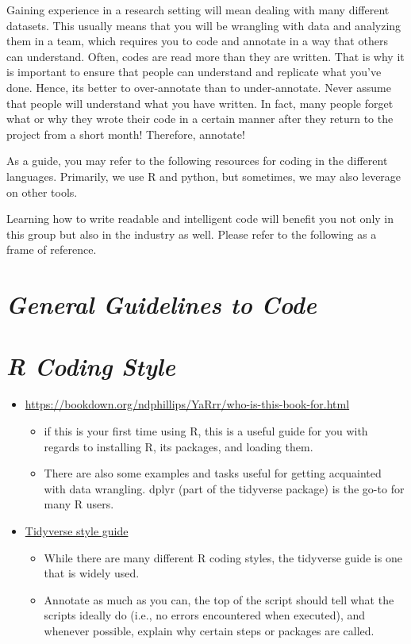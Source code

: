 \documentclass[
]{book}
\providecommand{\tightlist}{%
  \setlength{\itemsep}{0pt}\setlength{\parskip}{0pt}}
\begin{document}
Gaining experience in a research setting will mean dealing with many different datasets. This usually means that you will be wrangling with data and analyzing them in a team, which requires you to code and annotate in a way that others can understand. Often, codes are read more than they are written. That is why it is important to ensure that people can understand and replicate what you've done. Hence, its better to over-annotate than to under-annotate. Never assume that people will understand what you have written. In fact, many people forget what or why they wrote their code in a certain manner after they return to the project from a short month! Therefore, annotate!

As a guide, you may refer to the following resources for coding in the different languages. Primarily, we use R and python, but sometimes, we may also leverage on other tools.

Learning how to write readable and intelligent code will benefit you not only in this group but also in the industry as well. Please refer to the following as a frame of reference.

\hypertarget{general-guidelines-to-code}{%
\section{\texorpdfstring{\emph{General Guidelines to Code}}{General Guidelines to Code}}\label{general-guidelines-to-code}}

\hypertarget{r-coding-style}{%
\section{\texorpdfstring{\emph{R Coding Style}}{R Coding Style}}\label{r-coding-style}}

\begin{itemize}
\item
  \url{https://bookdown.org/ndphillips/YaRrr/who-is-this-book-for.html}

  \begin{itemize}
  \tightlist
  \item
    if this is your first time using R, this is a useful guide for you with regards to installing R, its packages, and loading them.
  \item
    There are also some examples and tasks useful for getting acquainted with data wrangling. dplyr (part of the tidyverse package) is the go-to for many R users.
  \end{itemize}
\item
  \href{https://style.tidyverse.org/}{Tidyverse style guide}

  \begin{itemize}
  \tightlist
  \item
    While there are many different R coding styles, the tidyverse guide is one that is widely used.
  \item
    Annotate as much as you can, the top of the script should tell what the scripts ideally do (i.e., no errors encountered when executed), and whenever possible, explain why certain steps or packages are called.
  \end{itemize}
\end{itemize}
\end{document}
